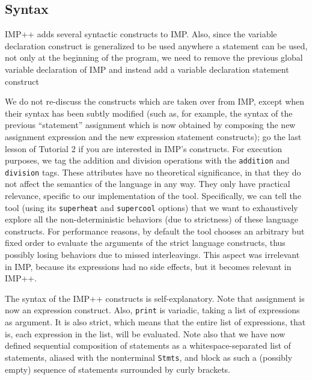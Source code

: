 \documentclass{article}
\begin{document}
\begin{kdefinition}
\begin{module}{}
\begin{kblock}[text]
 \section{Syntax}
IMP++ adds several syntactic constructs to IMP\@.  Also, since the
variable declaration construct is generalized to be used anywhere a
statement can be used, not only at the beginning of the program, we
need to remove the previous global variable declaration of IMP and
instead add a variable declaration statement construct

We do not re-discuss the constructs which are taken over from IMP,
except when their syntax has been subtly modified (such as, for
example, the syntax of the previous ``statement'' assignment which
is now obtained by composing the new assignment expression and the
new expression statement constructs); go the last lesson of
Tutorial 2 if you are interested in IMP's constructs.  For execution
purposes, we tag the addition and division operations with the
\texttt{addition} and \texttt{division} tags.  These attributes have
no theoretical significance, in that they do not affect the semantics
of the language in any way.  They only have practical relevance,
specific to our implementation of the \K tool.  Specifically, we can
tell the \K tool (using its \texttt{superheat} and \texttt{supercool}
options) that we want to exhaustively explore all the non-deterministic
behaviors (due to strictness) of these language constructs.  For performance
reasons, by default the \K tool chooses an arbitrary but fixed order to
evaluate the arguments of the strict language constructs, thus possibly
losing behaviors due to missed interleavings.  This aspect was irrelevant in
IMP, because its expressions had no side effects, but it becomes relevant
in IMP++\@.

The syntax of the IMP++ constructs is self-explanatory.  Note that assignment
is now an expression construct.  Also, \texttt{print} is variadic, taking a
list of expressions as argument.  It is also strict, which means that the
entire list of expressions, that is, each expression in the list, will be
evaluated.  Note also that we have now defined sequential composition
of statements as a whitespace-separated list of statements, aliased with
the nonterminal \texttt{Stmts}, and block as such a (possibly empty) sequence
of statements surrounded by curly brackets.  \end{kblock}


\end{module}
\end{kdefinition}
\end{document}
